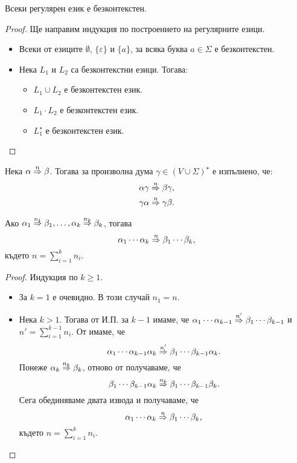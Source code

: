 \begin{framed}
  \begin{thm}
    Всеки регулярен език е безконтекстен.
  \end{thm}
\end{framed}
\begin{proof}
  Ще направим индукция по построението на регулярните езици.
  \begin{itemize}
  \item
    Всеки от езиците $\emptyset$, $\{\varepsilon\}$ и $\{a\}$, за всяка буква $a \in \Sigma$ е безконтекстен.
  \item
    Нека $L_1$ и $L_2$ са безконтекстни езици. Тогава:
    \begin{itemize}
    \item
      $L_1 \cup L_2$ е безконтекстен език.
    \item
      $L_1 \cdot L_2$ е безконтекстен език.
    \item
      $L^\star_1$ е безконтекстен език.
    \end{itemize}
  \end{itemize}
\end{proof}

\begin{proposition}
  \label{pr:grammar:add}
  Нека $\alpha \stackrel{{n}}{\Rightarrow} \beta$. Тогава за произволна дума $\gamma \in (V \cup \Sigma)^\star$ е изпълнено, че:
  \begin{align*}
    & \alpha\gamma \stackrel{{n}}{\Rightarrow} \beta \gamma,\\
    & \gamma\alpha \stackrel{{n}}{\Rightarrow} \gamma \beta.
  \end{align*}
\end{proposition}

\begin{proposition}
  \label{pr:grammar:concat}
  Ако $\alpha_1 \stackrel{{n_1}}{\Rightarrow} \beta_1, \dots, \alpha_k \stackrel{{n_k}}{\Rightarrow} \beta_k$, тогава
  \[\alpha_1\cdots\alpha_k \stackrel{{n}}{\Rightarrow} \beta_1\cdots\beta_k,\]
  където $n = \sum^k_{i=1} n_i$.
\end{proposition}
\begin{proof}
  Индукция по $k \geq 1$.
  \begin{itemize}
  \item
    За $k = 1$ е очевидно. В този случай $n_1 = n$.
  \item
   Нека $k > 1$. Тогава от И.П. за $k-1$ имаме, че
   $\alpha_1\cdots\alpha_{k-1} \stackrel{{n'}}{\Rightarrow} \beta_1\cdots\beta_{k-1}$ и $n' = \sum^{k-1}_{i=1} n_i$.
   От  имаме, че
   \[\alpha_1\cdots\alpha_{k-1}\alpha_{k} \stackrel{{n'}}{\Rightarrow} \beta_1\cdots\beta_{k-1}\alpha_k.\]
   Понеже $\alpha_k \stackrel{{n_k}}{\Rightarrow} \beta_k$, отново от  получаваме, че
   \[\beta_1\cdots\beta_{k-1}\alpha_k \stackrel{{n_k}}{\Rightarrow} \beta_1 \cdots \beta_{k-1}\beta_k.\]
   Сега обединяваме двата извода и получаваме, че
   \[\alpha_1\cdots\alpha_{k} \stackrel{{n}}{\Rightarrow} \beta_1\cdots\beta_k,\]
   където $n = \sum^k_{i=1} n_i$.
  \end{itemize}
\end{proof}

